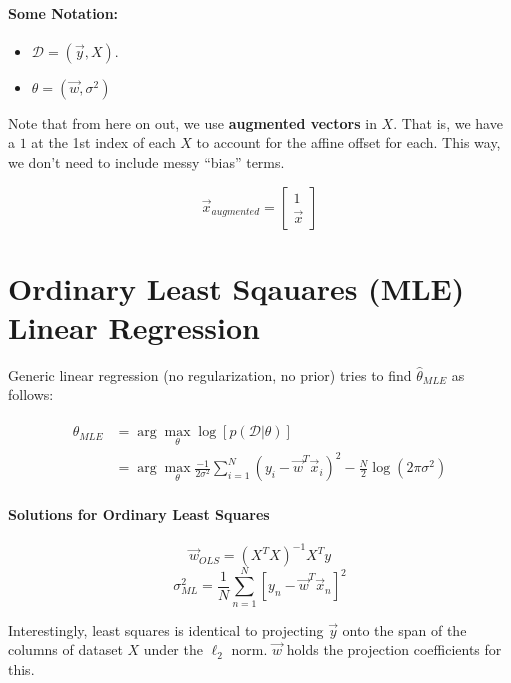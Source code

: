 \documentclass[a4paper,12pt]{report}
\begin{document}
\paragraph{Some Notation: } 
\begin{itemize}
\item $\mathcal D = (\vec y, X)$.
\item $\theta = (\vec w, \sigma^2)$
\end{itemize}
Note that from here on out, we use \textbf{augmented vectors} in $X$. That is, we have a $1$ at the 1st index of each $X$ to account for the affine offset for each. This way, we don't need to include messy ``bias'' terms.

$$\vec x_{augmented} = \begin{bmatrix} 1\\\vec x \end{bmatrix}$$




\section{Ordinary Least Sqauares (MLE) Linear Regression}

Generic linear regression (no regularization, no prior) tries to find $\hat \theta_{MLE}$ as follows: 

\begin{equation}
\begin{split}
\hat \theta_{MLE} &= \arg\max_{\theta} \log[p(\mathcal D | \theta)] \\
&= \arg\max_{\theta} \frac{-1}{2\sigma^2} \sum_{i=1}^{N} (y_i - \vec w^T \vec x_i)^2 - \frac{N}{2} \log(2\pi\sigma^2)
\end{split}
\end{equation}

\paragraph{Solutions for Ordinary Least Squares} 

\begin{equation}
\vec w_{OLS} = (X^T X)^{-1} X^T y
\end{equation}
\begin{equation}
\sigma^2_{ML} = \frac{1}{N} \sum_{n=1}^{N} [y_n - \vec w^T \vec x_n]^2
\end{equation}

Interestingly, least squares is identical to projecting $\vec y$ onto the span of the columns of dataset $X$ under the $\ell_2$ norm. $\vec w$ holds the projection coefficients for this. 
\end{document}
